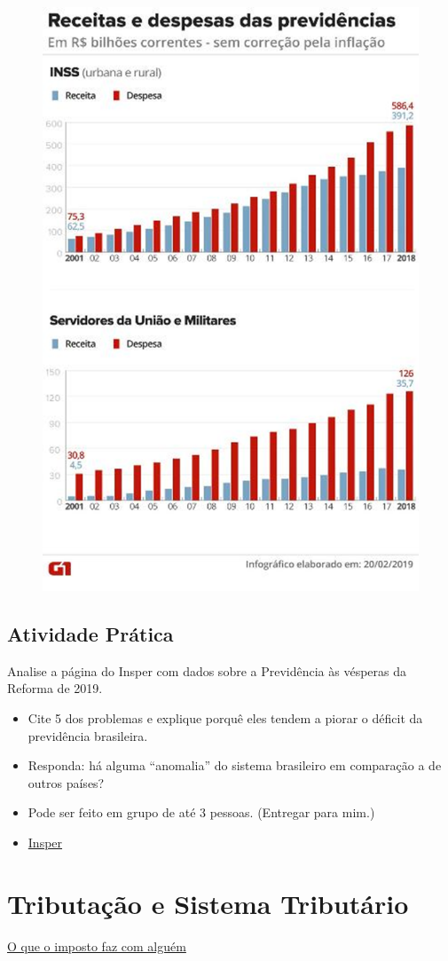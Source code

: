 \documentclass[a4paper,12pt]{article}[abntex2]
\begin{document}
\begin{figure}[H]
    \centering
    \includegraphics[width=0.7\linewidth]{Imagens/a17i3.png}
\end{figure}

\subsection{\textbf{Atividade Prática}}

Analise a página do Insper com dados sobre a Previdência às vésperas da Reforma de 2019. \begin{itemize}
    \item Cite 5 dos problemas e explique porquê eles tendem a piorar o déficit da previdência brasileira.
    \item Responda: há alguma “anomalia” do sistema brasileiro em comparação a de outros países?
    \item Pode ser feito em grupo de até 3 pessoas. (Entregar para mim.)
    \item \href{https://www.insper.edu.br/conhecimento/conjuntura-economica/reforma-previdencia-brasil-em-graficos/}{Insper}
\end{itemize}

\newpage
\section{\textbf{Tributação e Sistema Tributário}}
\href{https://www.youtube.com/watch?v=fQ0t_BuXIrU}{O que o imposto faz com alguém}
\end{document}
